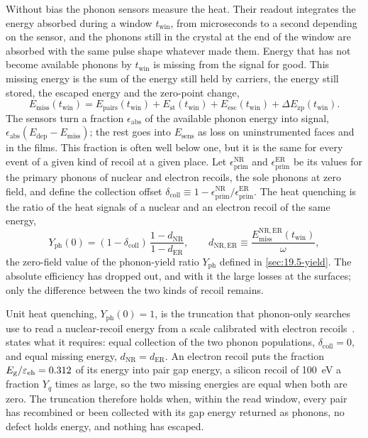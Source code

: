 Without bias the phonon sensors measure the heat. Their readout integrates the energy absorbed during a window $t_{\mathrm{win}}$, from microseconds to a second depending on the sensor, and the phonons still in the crystal at the end of the window are absorbed with the same pulse shape whatever made them. Energy that has not become available phonons by $t_{\mathrm{win}}$ is missing from the signal for good. This missing energy is the sum of the energy still held by carriers, the energy still stored, the escaped energy and the zero-point change,
\begin{equation*}
  E_{\mathrm{miss}}(t_{\mathrm{win}}) = E_{\mathrm{pairs}}(t_{\mathrm{win}}) + E_{\mathrm{st}}(t_{\mathrm{win}}) + E_{\mathrm{esc}}(t_{\mathrm{win}}) + \Delta E_{\mathrm{zp}}(t_{\mathrm{win}}) .
\end{equation*}
The sensors turn a fraction $\epsilon_{\mathrm{abs}}$ of the available phonon energy into signal, $\epsilon_{\mathrm{abs}}(E_{\mathrm{dep}} - E_{\mathrm{miss}})$; the rest goes into $E_{\mathrm{sens}}$ as loss on uninstrumented faces and in the films. This fraction is often well below one, but it is the same for every event of a given kind of recoil at a given place. Let $\epsilon^{\mathrm{NR}}_{\mathrm{prim}}$ and $\epsilon^{\mathrm{ER}}_{\mathrm{prim}}$ be its values for the primary phonons of nuclear and electron recoils, the sole phonons at zero field, and define the collection offset $\delta_{\mathrm{coll}} \equiv 1 - \epsilon^{\mathrm{NR}}_{\mathrm{prim}}/\epsilon^{\mathrm{ER}}_{\mathrm{prim}}$. The heat quenching is the ratio of the heat signals of a nuclear and an electron recoil of the same energy,
\begin{equation}
  Y_{\mathrm{ph}}(0) = (1 - \delta_{\mathrm{coll}})\,\frac{1 - d_{\mathrm{NR}}}{1 - d_{\mathrm{ER}}} , \qquad
  d_{\mathrm{NR},\mathrm{ER}} \equiv \frac{E^{\mathrm{NR},\mathrm{ER}}_{\mathrm{miss}}(t_{\mathrm{win}})}{\omega} ,
  \label{eq:19.5-heatq}
\end{equation}
the zero-field value of the phonon-yield ratio $Y_{\mathrm{ph}}$ defined in \cref{sec:19.5-yield}. The absolute efficiency has dropped out, and with it the large losses at the surfaces; only the difference between the two kinds of recoil remains.

Unit heat quenching, $Y_{\mathrm{ph}}(0) = 1$, is the truncation that phonon-only searches use to read a nuclear-recoil energy from a scale calibrated with electron recoils~\cite[p.~4]{alkhatib2021light}.  states what it requires: equal collection of the two phonon populations, $\delta_{\mathrm{coll}} = 0$, and equal missing energy, $d_{\mathrm{NR}} = d_{\mathrm{ER}}$. An electron recoil puts the fraction $E_{\mathrm{g}}/\varepsilon_{\mathrm{eh}} = 0.312$ of its energy into pair gap energy, a silicon recoil of \SI{100}{eV} a fraction $Y_q$ times as large, so the two missing energies are equal when both are zero. The truncation therefore holds when, within the read window, every pair has recombined or been collected with its gap energy returned as phonons, no defect holds energy, and nothing has escaped.


